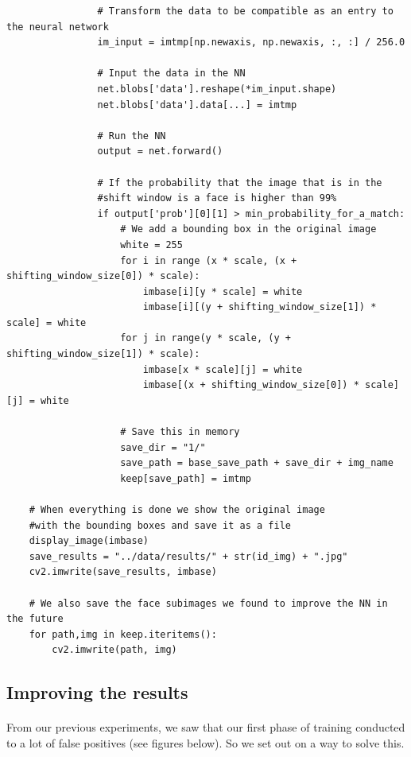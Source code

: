 \documentclass[french]{article}
\begin{document}
\begin{verbatim}
                # Transform the data to be compatible as an entry to the neural network
                im_input = imtmp[np.newaxis, np.newaxis, :, :] / 256.0
                
                # Input the data in the NN
                net.blobs['data'].reshape(*im_input.shape)
                net.blobs['data'].data[...] = imtmp
                
                # Run the NN
                output = net.forward()
                
                # If the probability that the image that is in the
                #shift window is a face is higher than 99%
                if output['prob'][0][1] > min_probability_for_a_match:
                    # We add a bounding box in the original image
                    white = 255
                    for i in range (x * scale, (x + shifting_window_size[0]) * scale):
                        imbase[i][y * scale] = white
                        imbase[i][(y + shifting_window_size[1]) * scale] = white
                    for j in range(y * scale, (y + shifting_window_size[1]) * scale):
                        imbase[x * scale][j] = white
                        imbase[(x + shifting_window_size[0]) * scale][j] = white

                    # Save this in memory
                    save_dir = "1/"
                    save_path = base_save_path + save_dir + img_name
                    keep[save_path] = imtmp
    
    # When everything is done we show the original image
    #with the bounding boxes and save it as a file
    display_image(imbase)
    save_results = "../data/results/" + str(id_img) + ".jpg"
    cv2.imwrite(save_results, imbase)
    
    # We also save the face subimages we found to improve the NN in the future
    for path,img in keep.iteritems():
        cv2.imwrite(path, img)
\end{verbatim}

\subsection{Improving the results}

\paragraph{} From our previous experiments, we saw that our first phase of training conducted to a lot of false positives (see figures below). So we set out on a way to solve this.
\end{document}
